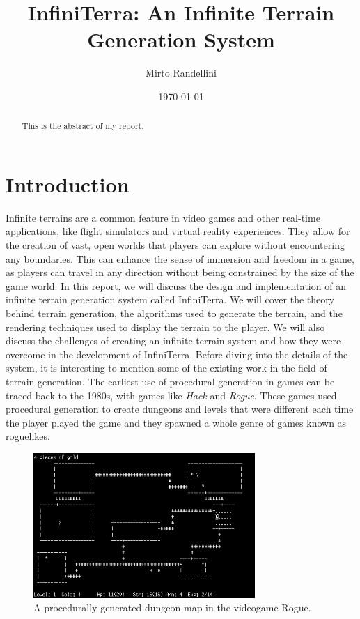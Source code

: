 \documentclass{report}
\title{InfiniTerra: An Infinite Terrain Generation System}
\author{Mirto Randellini}
\date{\today}
\begin{document}
\maketitle

\tableofcontents

\begin{abstract}
This is the abstract of my report.
\end{abstract}

\chapter{Introduction}
\label{ch:introduction}
Infinite terrains are a common feature in video games and other real-time applications, like flight simulators and virtual reality experiences.
They allow for the creation of vast, open worlds that players can explore without encountering any boundaries.
This can enhance the sense of immersion and freedom in a game, as players can travel in any direction without being constrained by the size of the game world.
In this report, we will discuss the design and implementation of an infinite terrain generation system called InfiniTerra.
We will cover the theory behind terrain generation, the algorithms used to generate the terrain, and the rendering techniques used to display the terrain to the player.
We will also discuss the challenges of creating an infinite terrain system and how they were overcome in the development of InfiniTerra.
Before diving into the details of the system, it is interesting to mention some of the existing work in the field of terrain generation.
The earliest use of procedural generation in games can be traced back to the 1980s, with games like \textit{Hack} and \textit{Rogue}.
These games used procedural generation to create dungeons and levels that were different each time the player played the game and they spawned a whole genre of games known as roguelikes.

\begin{figure}[h!]
  \centering
  \includegraphics[width=0.75\textwidth]{img/rogue.png}
  \caption{A procedurally generated dungeon map in the videogame Rogue.}
  \label{fig:nethack}
\end{figure}
\end{document}
